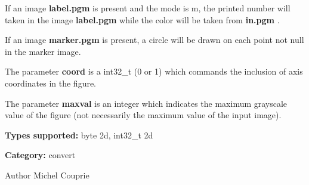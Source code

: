If an image {\bfseries label.pgm} is present and the mode is m, the printed number will taken in the image {\bfseries label.pgm} while the color will be taken from {\bfseries in.pgm} .

If an image {\bfseries marker.pgm} is present, a circle will be drawn on each point not null in the marker image.

The parameter {\bfseries coord} is a int32\_\-t (0 or 1) which commands the inclusion of axis coordinates in the figure.

The parameter {\bfseries maxval} is an integer which indicates the maximum grayscale value of the figure (not necessarily the maximum value of the input image).

{\bfseries Types supported:} byte 2d, int32\_\-t 2d

{\bfseries Category:} convert

\begin{DoxyAuthor}{Author}
Michel Couprie 
\end{DoxyAuthor}
